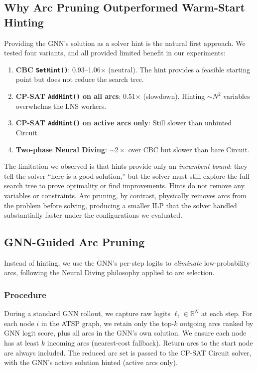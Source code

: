 \documentclass[review,times]{elsarticle}
\begin{document}
\subsection{Why Arc Pruning Outperformed Warm-Start Hinting}\label{sec:hint_fail}

Providing the GNN's solution as a solver hint is the natural first approach. We tested four variants, and all provided limited benefit in our experiments:

\begin{enumerate}
\item \textbf{CBC \texttt{SetHint()}}: 0.93--1.06$\times$ (neutral). The hint provides a feasible starting point but does not reduce the search tree.
\item \textbf{CP-SAT \texttt{AddHint()} on all arcs}: 0.51$\times$ (slowdown). Hinting ${\sim}N^2$ variables overwhelms the LNS workers.
\item \textbf{CP-SAT \texttt{AddHint()} on active arcs only}: Still slower than unhinted Circuit.
\item \textbf{Two-phase Neural Diving}: ${\sim}2\times$ over CBC but slower than bare Circuit.
\end{enumerate}

The limitation we observed is that hints provide only an \emph{incumbent bound}: they tell the solver ``here is a good solution,'' but the solver must still explore the full search tree to prove optimality or find improvements. Hints do not remove any variables or constraints. Arc pruning, by contrast, physically removes arcs from the problem before solving, producing a smaller ILP that the solver handled substantially faster under the configurations we evaluated.

\subsection{GNN-Guided Arc Pruning}

Instead of hinting, we use the GNN's per-step logits to \emph{eliminate} low-probability arcs, following the Neural Diving philosophy \cite{nair2021neural} applied to arc selection.

\subsubsection{Procedure} During a standard GNN rollout, we capture raw logits $\ell_t \in \mathbb{R}^N$ at each step. For each node $i$ in the ATSP graph, we retain only the top-$k$ outgoing arcs ranked by GNN logit score, plus all arcs in the GNN's own solution. We ensure each node has at least $k$ incoming arcs (nearest-cost fallback). Return arcs to the start node are always included. The reduced arc set is passed to the CP-SAT Circuit solver, with the GNN's active solution hinted (active arcs only).
\end{document}
